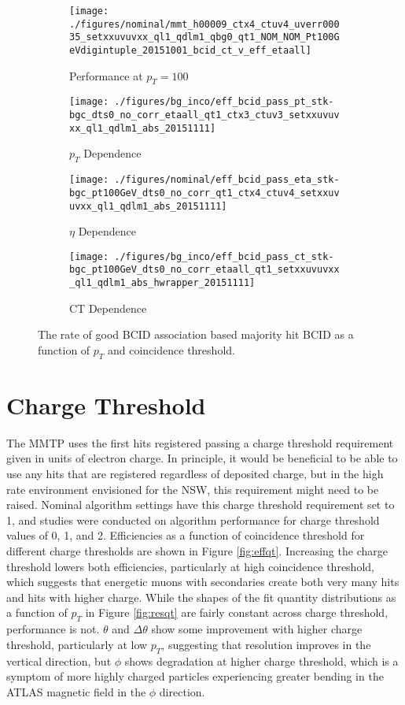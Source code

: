 \begin{figure}[!htbp]\captionsetup{justification=centering}\captionsetup{justification=centering}
  \centering
\begin{subfigure}[t]{0.225\textwidth\textwidth}\centering\texttt{[image: ./figures/nominal/mmt\_h00009\_ctx4\_ctuv4\_uverr00035\_setxxuvuvxx\_ql1\_qdlm1\_qbg0\_qt1\_NOM\_NOM\_Pt100GeVdigintuple\_20151001\_bcid\_ct\_v\_eff\_etaall]}\caption{Performance at $p_T=100$ \GeV}\end{subfigure}
\begin{subfigure}[t]{0.45\textwidth\textwidth}\centering\texttt{[image: ./figures/bg\_inco/eff\_bcid\_pass\_pt\_stk-bgc\_dts0\_no\_corr\_etaall\_qt1\_ctx3\_ctuv3\_setxxuvuvxx\_ql1\_qdlm1\_abs\_20151111]}\caption{$p_T$ Dependence}\end{subfigure}
\begin{subfigure}[t]{0.32\textwidth\textwidth}\centering\texttt{[image: ./figures/nominal/eff\_bcid\_pass\_eta\_stk-bgc\_pt100GeV\_dts0\_no\_corr\_qt1\_ctx4\_ctuv4\_setxxuvuvxx\_ql1\_qdlm1\_abs\_20151111]}\caption{$\eta$ Dependence}\end{subfigure}
\begin{subfigure}[t]{0.45\textwidth\textwidth}\centering\texttt{[image: ./figures/bg\_inco/eff\_bcid\_pass\_ct\_stk-bgc\_pt100GeV\_dts0\_no\_corr\_etaall\_qt1\_setxxuvuvxx\_ql1\_qdlm1\_abs\_hwrapper\_20151111]}\caption{CT Dependence}\end{subfigure}
  \caption{\label{fig:bcideff} The rate of good BCID association based majority hit BCID as a function of $p_T$ and coincidence threshold.}
\end{figure}

\section{Charge Threshold}
\label{subsec:qt}
The MMTP uses the first hits registered passing a charge threshold requirement given in units of electron charge.  In principle, it would be beneficial to be able to use any hits that are registered regardless of deposited charge, but in the high rate environment envisioned for the NSW, this requirement might need to be raised.  Nominal algorithm settings have this charge threshold requirement set to 1, and studies were conducted on algorithm performance for charge threshold values of 0, 1, and 2.  Efficiencies as a function of coincidence threshold for different charge thresholds are shown in Figure \ref{fig:effqt}.  Increasing the charge threshold lowers both efficiencies, particularly at high coincidence threshold, which suggests that energetic muons with secondaries create both very many hits and hits with higher charge.  While the shapes of the fit quantity distributions as a function of $p_T$ in Figure \ref{fig:resqt} are fairly constant across charge threshold, performance is not.  $\theta$ and $\Delta\theta$ show some improvement with higher charge threshold, particularly at low $p_T$, suggesting that resolution improves in the vertical direction, but $\phi$ shows degradation at higher charge threshold, which is a symptom of more highly charged particles experiencing greater bending in the ATLAS magnetic field in the $\phi$ direction.

